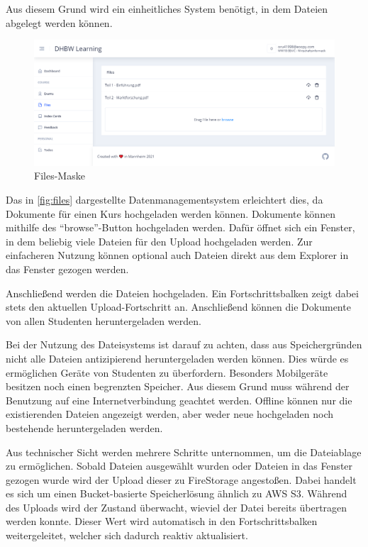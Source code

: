 Aus diesem Grund wird ein einheitliches System benötigt, in dem Dateien abgelegt werden können.

\begin{figure}[h] 
    \centering
    \includegraphics[width=\textwidth]{img/Files.png}
    \caption{Files-Maske}
    \label{fig:files}
\end{figure}

Das in \autoref{fig:files} dargestellte Datenmanagementsystem erleichtert dies, da Dokumente für einen Kurs hochgeladen werden können.
Dokumente können mithilfe des \enquote{browse}-Button hochgeladen werden.
Dafür öffnet sich ein Fenster, in dem beliebig viele Dateien für den Upload hochgeladen werden.
Zur einfacheren Nutzung können optional auch Dateien direkt aus dem Explorer in das Fenster gezogen werden.

Anschließend werden die Dateien hochgeladen.
Ein Fortschrittsbalken zeigt dabei stets den aktuellen Upload-Fortschritt an.
Anschließend können die Dokumente von allen Studenten heruntergeladen werden.


Bei der Nutzung des Dateisystems ist darauf zu achten, dass aus Speichergründen nicht alle Dateien antizipierend heruntergeladen werden können.
Dies würde es ermöglichen Geräte von Studenten zu überfordern.
Besonders Mobilgeräte besitzen noch einen begrenzten Speicher.
Aus diesem Grund muss während der Benutzung auf eine Internetverbindung geachtet werden.
Offline können nur die existierenden Dateien angezeigt werden, aber weder neue hochgeladen noch bestehende heruntergeladen werden.


Aus technischer Sicht werden mehrere Schritte unternommen, um die Dateiablage zu ermöglichen.
Sobald Dateien ausgewählt wurden oder Dateien in das Fenster gezogen wurde wird der Upload dieser zu FireStorage angestoßen.
Dabei handelt es sich um einen Bucket-basierte Speicherlösung ähnlich zu AWS S3. %
Während des Uploads wird der Zustand überwacht, wieviel der Datei bereits übertragen werden konnte.
Dieser Wert wird automatisch in den Fortschrittsbalken weitergeleitet, welcher sich dadurch reaktiv aktualisiert.


